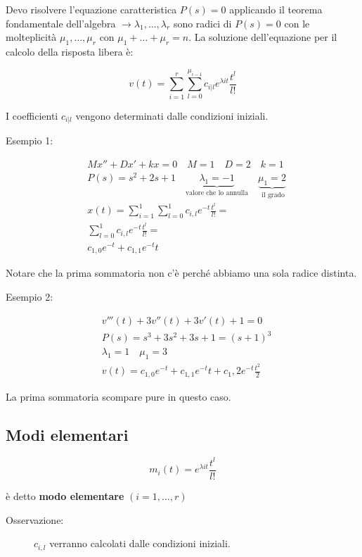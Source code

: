 \documentclass[a4paper, 12pt]{book}
\theoremstyle{plain}
\begin{document}
Devo risolvere l'equazione caratteristica $P(s) = 0$ applicando il teorema fondamentale dell'algebra $\rightarrow \lambda_1, \dots, \lambda_r$
sono radici di $P(s) = 0$ con le molteplicità $\mu_1, \dots, \mu_r$  con $\mu_1 + \dots + \mu_r = n$. La soluzione dell'equazione 
per il calcolo della risposta libera è:

\[
    v(t) = \sum_{i = 1}^r \sum_{l = 0}^{\mu_{i -1}} c_{i | l} e^{\lambda it} \frac{t^l}{l!}
\]

I coefficienti $c_{i | l}$ vengono determinati dalle condizioni iniziali. 

Esempio 1:

\[
    \begin{split}
        &Mx'' + Dx' + kx = 0 \quad M = 1 \quad D = 2 \quad k = 1 \\
        &P(s) = s^2 + 2s + 1 \quad \underbrace{\lambda_1 = -1}_{\textrm{valore che lo annulla}} \quad \underbrace{\mu_1 = 2}_{\textrm{ il grado}} \\
        &x(t) = \sum_{i = 1}^1 \sum_{l = 0}^1 c_{i , l} e^{-t} \frac{t^l}{l!} = \\
        &\sum_{l = 0}^1 c_{i , l} e^{-t} \frac{t^l}{l!} = \\
        &c_{1, 0} e^{-t} + c_{1, 1} e^{-t} t
    \end{split}
\]

Notare che la prima sommatoria non c'è perché abbiamo una sola radice distinta.

Esempio 2:

\[
    \begin{split}
        &v'''(t) + 3v''(t) + 3v'(t) + 1 = 0 \\
        &P(s) = s^3 + 3s^2 + 3s + 1 = (s + 1)^3 \\
        &\lambda_1 = 1 \quad \mu_1 = 3 \\
        &v(t) = c_{1,0} e^{-t} + c_{1,1} e^{-t}t + c{_1,2} e^{-t} \frac{t^2}{2}
    \end{split}
\]

La prima sommatoria scompare pure in questo caso.

\subsection{Modi elementari}

\[
    m_i(t) = e^{\lambda it} \frac{t^l}{l!}
\]

è detto \textbf{modo elementare} $(i = 1,\dots,r)$

\begin{description}
    \item[Osservazione:] $c_{i,l}$ verranno calcolati dalle condizioni iniziali. 
\end{description}
\end{document}
